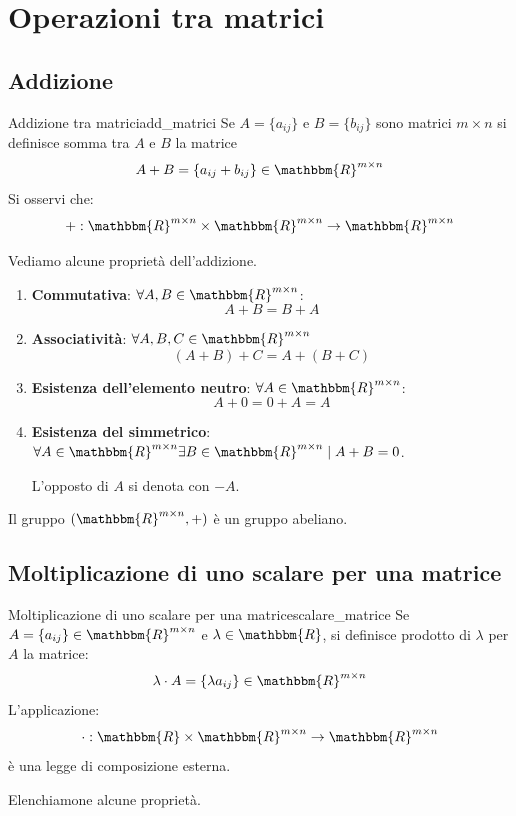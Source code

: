 \documentclass[12pt]{report}
\newcounter{definition}
\newcommand{\nmu}{}
\begin{document}
\section{Operazioni tra matrici}
\subsection{Addizione}
\begin{definition}{\nmu Addizione tra matrici}{add_matrici}
	Se $A = \{a_{ij}\}$ e $B = \{b_{ij}\}$ sono matrici $m \times n$ si definisce somma tra $A$ e $B$ la matrice
	\[
	A+B = \{a_{ij} + b_{ij}\} \in \mathbbm{R}^{m\times n}
	\]
	Si osservi che:
	\[
	+: \mathbbm{R}^{m\times n} \times \mathbbm{R}^{m\times n} \to \mathbbm{R}^{m\times n}
	\]
\end{definition}
Vediamo alcune proprietà dell'addizione.
\begin{enumerate}
	\item \textbf{Commutativa}: $\forall A, B \in \mathbbm{R}^{m\times n}$:
	\[
	A + B = B + A
	\]
	\item \textbf{Associatività}: $\forall A, B, C \in \mathbbm{R}^{m \times n}$
	\[
	(A+B)+C = A + (B+C)
	\]
	\item \textbf{Esistenza dell'elemento neutro}: $\forall A \in \mathbbm{R}^{m\times n}$:
	\[
	A + 0 = 0 + A = A
	\]
	\item \textbf{Esistenza del simmetrico}: $\forall A \in \mathbbm{R}^{m\times n} \exists B \in \mathbbm{R}^{m\times n} \mid A + B = 0$.

	L'opposto di $A$ si denota con $-A$.
\end{enumerate}
\begin{note}{}{}
Il gruppo $(\mathbbm{R}^{m\times n}, +)$ è un gruppo abeliano.
\end{note}
\subsection{Moltiplicazione di uno scalare per una matrice}
\begin{definition}{\nmu Moltiplicazione di uno scalare per una matrice}{scalare_matrice}
	Se $A = \{a_{ij}\} \in \mathbbm{R}^{m\times n}$ e $\lambda \in \mathbbm{R}$, si definisce prodotto di $\lambda$ per $A$ la matrice:
	\[
	\lambda \cdot A = \{\lambda a_{ij}\} \in \mathbbm{R}^{m\times n}
	\]
	L'applicazione:
	\[
	\cdot: \mathbbm{R} \times \mathbbm{R}^{m\times n} \to \mathbbm{R}^{m\times n}
	\]
	è una legge di composizione esterna.
\end{definition}
Elenchiamone alcune proprietà.
\end{document}
